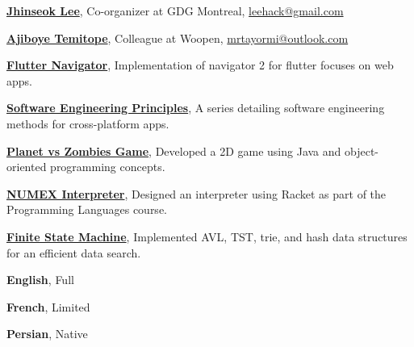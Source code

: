 \documentclass[letterpaper,11pt]{article}
\begin{document}


\href{https://linkedin.com/in/leehack}
{\textbf{Jhinseok Lee}}, Co-organizer at GDG Montreal, \href{mailto:leehack@gmail.com}{leehack@gmail.com}

\Gap
\href{https://linkedin.com/in/tayormi}
{\textbf{Ajiboye Temitope}}, Colleague at Woopen, \href{mailto:mrtayormi@outlook.comm}{mrtayormi@outlook.com}




\href{https://medium.com/flutter-community/lets-make-the-flutter-navigator-2-bc5953251c3e?source=friends_link&sk=e1ff30235ab93276b558c5b5ef1dd15f}
{\textbf{Flutter Navigator}}, Implementation of navigator 2 for flutter focuses on web apps.

\Gap
\href{https://medium.com/flutter-community/the-software-engineering-approach-in-cross-platform-programming-with-flutter-part-1-efcdc8a8fc26?source=friends_link&sk=ceb60f56685ce66c7f9574595748f25b}
{\textbf{Software Engineering Principles}}, A series detailing software engineering methods for cross-platform apps.



\href{https://github.com/aliyazdi75/Planet_vs_Zombies}
{\textbf{Planet vs Zombies Game}}, Developed a 2D game using Java and object-oriented programming concepts.

\Gap
\href{https://github.com/aliyazdi75/NUMEX-Interpreter}
{\textbf{NUMEX Interpreter}}, Designed an interpreter using Racket as part of the Programming Languages course.

\Gap
\href{https://github.com/aliyazdi75/Finite-State-Machine}
{\textbf{Finite State Machine}}, Implemented AVL, TST, trie, and hash data structures for an efficient data search.



\textbf{English}, Full

\Gap
\textbf{French}, Limited

\Gap
\textbf{Persian}, Native
\end{document}
